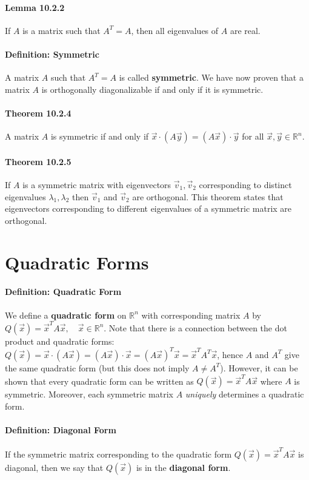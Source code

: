 \documentclass[10pt,letter]{article}
\begin{document}
\paragraph{Lemma 10.2.2}
If $A$ is a matrix such that $A^T=A$, then all eigenvalues of $A$ are real. 
\paragraph{Definition: Symmetric}
A matrix $A$ such that $A^T=A$ is called \textbf{symmetric}. We have now proven that a matrix $A$ is orthogonally diagonalizable if and only if it is symmetric. 
\paragraph{Theorem 10.2.4}
A matrix $A$ is symmetric if and only if $\vec{x}\cdot(A\vec{y})=(A\vec{x})\cdot\vec{y}$ for all $\vec{x},\vec{y}\in\mathbb{R}^n$. 
\paragraph{Theorem 10.2.5}
If $A$ is a symmetric matrix with eigenvectors $\vec{v}_1,\vec{v}_2$ corresponding to distinct eigenvalues $\lambda_1,\lambda_2$ then $\vec{v}_1$ and $\vec{v}_2$ are orthogonal. This theorem states that eigenvectors corresponding to different eigenvalues of a symmetric matrix are orthogonal. 

\section*{Quadratic Forms}
\paragraph{Definition: Quadratic Form}
We define a \textbf{quadratic form} on $\mathbb{R}^n$ with corresponding matrix $A$ by $Q(\vec{x})=\vec{x}^TA\vec{x},\quad\vec{x}\in\mathbb{R}^n$. Note that there is a connection between the dot product and quadratic forms: $Q(\vec{x})=\vec{x}\cdot(A\vec{x})=(A\vec{x})\cdot\vec{x}=(A\vec{x})^T\vec{x}=\vec{x}^TA^T\vec{x}$, hence $A$ and $A^T$ give the same quadratic form (but this does not imply $A\neq A^T$). However, it can be shown that every quadratic form can be written as $Q(\vec{x})=\vec{x}^TA\vec{x}$ where $A$ is symmetric. Moreover, each symmetric matrix $A$ \textit{uniquely} determines a quadratic form. 

\paragraph{Definition: Diagonal Form}
If the symmetric matrix corresponding to the quadratic form $Q(\vec{x})=\vec{x}^TA\vec{x}$ is diagonal, then we say that $Q(\vec{x})$ is in the \textbf{diagonal form}. 
\end{document}
